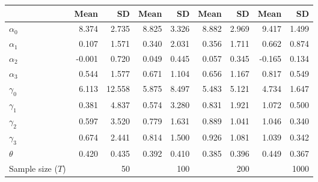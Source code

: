 
\begin{tabular}[t]{lrrrrrrrr}
\toprule
  & Mean & SD & Mean  & SD  & Mean   & SD   & Mean    & SD   \\
\midrule
$\alpha_{0}$ & 8.374 & 2.735 & 8.825 & 3.326 & 8.882 & 2.969 & 9.417 & 1.499\\
$\alpha_{1}$ & 0.107 & 1.571 & 0.340 & 2.031 & 0.356 & 1.711 & 0.662 & 0.874\\
$\alpha_{2}$ & -0.001 & 0.720 & 0.049 & 0.445 & 0.057 & 0.345 & -0.165 & 0.134\\
$\alpha_{3}$ & 0.544 & 1.577 & 0.671 & 1.104 & 0.656 & 1.167 & 0.817 & 0.549\\
$\gamma_{0}$ & 6.113 & 12.558 & 5.875 & 8.497 & 5.483 & 5.121 & 4.734 & 1.647\\
$\gamma_{1}$ & 0.381 & 4.837 & 0.574 & 3.280 & 0.831 & 1.921 & 1.072 & 0.500\\
$\gamma_{2}$ & 0.597 & 3.520 & 0.779 & 1.631 & 0.889 & 1.041 & 1.046 & 0.340\\
$\gamma_{3}$ & 0.674 & 2.441 & 0.814 & 1.500 & 0.926 & 1.081 & 1.039 & 0.342\\
$\theta$ & 0.420 & 0.435 & 0.392 & 0.410 & 0.385 & 0.396 & 0.449 & 0.367\\
Sample size ($T$) &  & 50 &  & 100 &  & 200 &  & 1000\\
\bottomrule
\end{tabular}

